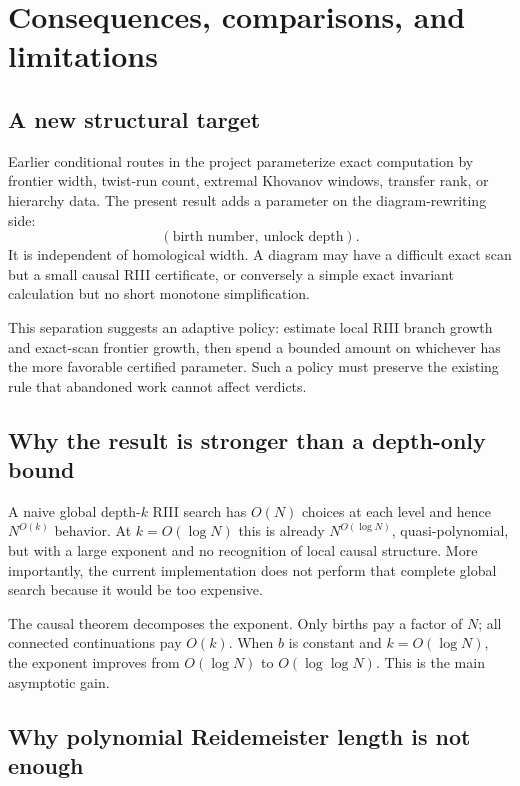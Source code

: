 \section{Consequences, comparisons, and limitations}
\label{sec:consequences}

\subsection{A new structural target}

Earlier conditional routes in the project parameterize exact computation by
frontier width, twist-run count, extremal Khovanov windows, transfer rank, or
hierarchy data.  The present result adds a parameter on the diagram-rewriting
side:
\[
  (\text{birth number},\ \text{unlock depth}).
\]
It is independent of homological width.  A diagram may have a difficult exact
scan but a small causal RIII certificate, or conversely a simple exact invariant
calculation but no short monotone simplification.

This separation suggests an adaptive policy: estimate local RIII branch growth
and exact-scan frontier growth, then spend a bounded amount on whichever has the
more favorable certified parameter.  Such a policy must preserve the existing
rule that abandoned work cannot affect verdicts.

\subsection{Why the result is stronger than a depth-only bound}

A naive global depth-$k$ RIII search has $O(N)$ choices at each level and hence
$N^{O(k)}$ behavior.  At $k=O(\log N)$ this is already
$N^{O(\log N)}$, quasi-polynomial, but with a large exponent and no recognition
of local causal structure.  More importantly, the current implementation does
not perform that complete global search because it would be too expensive.

The causal theorem decomposes the exponent.  Only births pay a factor of $N$;
all connected continuations pay $O(k)$.  When $b$ is constant and
$k=O(\log N)$, the exponent improves from $O(\log N)$ to
$O(\log\log N)$.  This is the main asymptotic gain.

\subsection{Why polynomial Reidemeister length is not enough}

